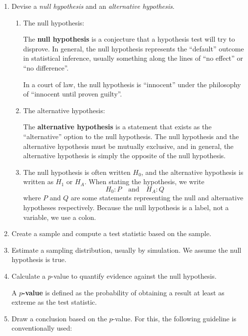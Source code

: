 \documentclass[10pt]{article}
\newenvironment{definition}[1][]{\begin{tcolorbox}[colframe=_orange,colback=_orange2,title=Definition. \ifthenelse{\isempty{#1}}{}{(#1)}
]}{\end{tcolorbox}}
\newcommand{\spacer}[0]{\par\vspace{0.1in}}
\begin{document}
\begin{enumerate}
    \item Devise a \textit{null hypothesis} and an \textit{alternative hypothesis}.
    \begin{enumerate}
        \item The null hypothesis:
            \begin{definition}
                The \textbf{null hypothesis} is a conjecture that a hypothesis test will try to disprove. In general, the null hypothesis represents the ``default'' outcome in statistical inference, usually something along the lines of ``no effect'' or ``no difference''.\spacer
                In a court of law, the null hypothesis is ``innocent'' under the philosophy of ``innocent until proven guilty''.
            \end{definition}
        \item The alternative hypothesis:
            \begin{definition}
                The \textbf{alternative hypothesis} is a statement that exists as the ``alternative'' option to the null hypothesis. The null hypothesis and the alternative hypothesis must be mutually exclusive, and in general, the alternative hypothesis is simply the opposite of the null hypothesis.
            \end{definition}
        \item The null hypothesis is often written $H_0$, and the alternative hypothesis is written as $H_1$ or $H_A$. When stating the hypothesis, we write
        $$
            H_0:P\quad\text{and}\quad H_A: Q
        $$
        where $P$ and $Q$ are some statements representing the null and alternative hypotheses respectively. Because the null hypothesis is a label, not a variable, we use a colon.
    \end{enumerate}
    \item Create a sample and compute a test statistic based on the sample.
    \item Estimate a sampling distribution, usually by simulation. We assume the null hypothesis is true.
    \item Calculate a $p$-value to quantify evidence against the null hypothesis.
        \begin{definition}
            A \textbf{$p$-value} is defined as the probability of obtaining a result at least as extreme as the test statistic. 
        \end{definition}
    \item Draw a conclusion based on the $p$-value. For this, the following guideline is conventionally used:

\end{enumerate}
\end{document}
